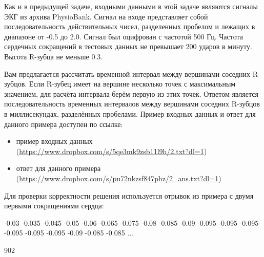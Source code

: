 
Как и в предыдущей задаче, входными данными в этой задаче являются сигналы ЭКГ из архива PhysioBank. Сигнал на входе представляет собой последовательность действительных чисел, разделенных пробелом и лежащих в диапазоне от -0.5 до 2.0. Сигнал был оцифрован с частотой 500 Гц. Частота сердечных сокращений в тестовых данных не превышает 200 ударов в минуту. Высота R-зубца не меньше 0.3.

Вам предлагается рассчитать временной интервал между вершинами соседних R-зубцов. Если R-зубец имеет на вершине несколько точек с максимальным значением, для расчёта интервала берём первую из этих точек. Ответом является последовательность временных интервалов между вершинами соседних R-зубцов в миллисекундах, разделённых пробелами.
Пример входных данных и ответ для данного примера доступен по ссылке:

\begin{itemize}
    \item пример входных данных (\url{https://www.dropbox.com/s/5qe3mk9zsb11l9h/2.txt?dl=1})
    \item ответ для данного примера (\url{https://www.dropbox.com/s/pu72nkzsf847phz/2_ans.txt?dl=1})
\end{itemize}

Для проверки корректности решения используется отрывок из примера с двумя первыми сокращениями сердца:


\newpage


\begin{myverbbox}[\small]{\vinput}
    -0.03 -0.035 -0.045 -0.05 -0.06 -0.065 -0.075 -0.08 -0.085 -0.09
    -0.095 -0.095 -0.095 -0.095 -0.095 -0.095 -0.09 -0.085 -0.085
    ...
\end{myverbbox}
\begin{myverbbox}[\small]{\voutput}
   902
\end{myverbbox}

